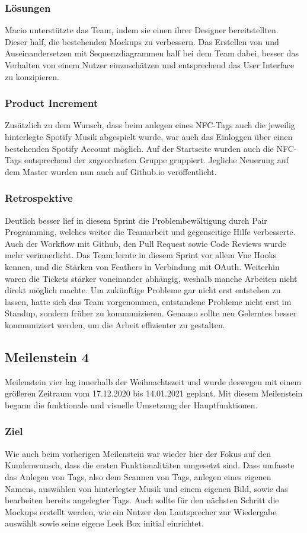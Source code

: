 \documentclass[10pt, a4paper, draft]{article}
\begin{document}
\subsubsection{Lösungen}
Macio unterstützte das Team, indem sie einen ihrer Designer bereitstellten.
Dieser half, die bestehenden Mockups zu verbessern.
Das Erstellen von und Auseinandersetzen mit Sequenzdiagrammen half bei dem Team dabei, besser das Verhalten von einem Nutzer einzuschätzen und entsprechend das User Interface zu konzipieren.
\subsubsection{Product Increment}
Zusätzlich zu dem Wunsch, dass beim anlegen eines NFC-Tags auch die jeweilig hinterlegte Spotify Musik abgespielt wurde, war auch das Einloggen über einen bestehenden Spotify Account möglich.
Auf der Startseite wurden auch die NFC-Tags entsprechend der zugeordneten Gruppe gruppiert.
Jegliche Neuerung auf dem Master wurden nun auch auf Github.io veröffentlicht.

\subsubsection{Retrospektive}
Deutlich besser lief in diesem Sprint die Problembewältigung durch Pair Programming, welches weiter die Teamarbeit und gegenseitige Hilfe verbesserte.
Auch der Workflow mit Github, den Pull Request sowie Code Reviews wurde mehr verinnerlicht.
Das Team lernte in diesem Sprint vor allem Vue Hooks kennen, und die Stärken von Feathers in Verbindung mit OAuth.
Weiterhin waren die Tickets stärker voneinander abhängig, weshalb manche Arbeiten nicht direkt möglich machte.
Um zukünftige Probleme gar nicht erst entstehen zu lassen, hatte sich das Team vorgenommen, entstandene Probleme nicht erst im Standup, sondern früher zu kommunizieren.
Genauso sollte neu Gelerntes besser kommuniziert werden, um die Arbeit effizienter zu gestalten.

\subsection{Meilenstein 4}
Meilenstein vier lag innerhalb der Weihnachtszeit und wurde deswegen mit einem größeren Zeitraum vom 17.12.2020 bis 14.01.2021 geplant.
Mit diesem Meilenstein begann die funktionale und visuelle Umsetzung der Hauptfunktionen.
\subsubsection{Ziel}
Wie auch beim vorherigen Meilenstein war wieder hier der Fokus auf den Kundenwunsch, dass die ersten Funktionalitäten umgesetzt sind.
Dass umfasste das Anlegen von Tags, also dem Scannen von Tags, anlegen eines eigenen Namens, auswählen von hinterlegter Musik und einem eigenen Bild, sowie das bearbeiten bereits angelegter Tags.
Auch sollte für den nächsten Schritt die Mockups erstellt werden, wie ein Nutzer den Lautsprecher zur Wiedergabe auswählt sowie seine eigene Leek Box initial einrichtet.
\end{document}
